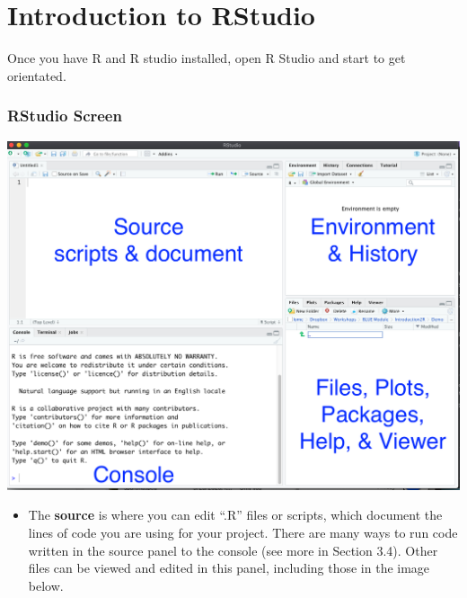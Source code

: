 \documentclass[
]{book}
\providecommand{\tightlist}{%
  \setlength{\itemsep}{0pt}\setlength{\parskip}{0pt}}
\begin{document}
\hypertarget{introduction-to-rstudio}{%
\section{Introduction to RStudio}\label{introduction-to-rstudio}}

Once you have R and R studio installed, open R Studio and start to get orientated.

\hypertarget{rstudio-screen}{%
\subsubsection*{RStudio Screen}\label{rstudio-screen}}

\begin{center}\includegraphics[width=0.7\linewidth]{img/Rsetup} \end{center}

\begin{itemize}
\tightlist
\item
  The \textbf{source} is where you can edit ``.R'' files or scripts, which document the lines of code you are using for your project. There are many ways to run code written in the source panel to the console (see more in Section 3.4). Other files can be viewed and edited in this panel, including those in the image below.
\end{itemize}
\end{document}
